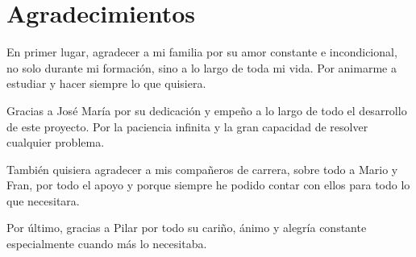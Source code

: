 \documentclass[
11pt, %
oneside, %
spanish, %
singlespacing, %
parskip, %
headsepline, %
]{MastersDoctoralThesis} %
\author{Javier Benito Díaz} %
\begin{document}
\frontmatter %

\pagestyle{plain} %









%
%
%

\chapter*{Agradecimientos}

En primer lugar, agradecer a mi familia por su amor constante e incondicional, no solo durante mi formación, sino a lo largo de toda mi vida. Por animarme a estudiar y hacer siempre lo que quisiera.

Gracias a José María por su dedicación y empeño a lo largo de todo el desarrollo de este proyecto. Por la paciencia infinita y la gran capacidad de resolver cualquier problema.

También quisiera agradecer a mis compañeros de carrera, sobre todo a Mario y Fran, por todo el apoyo y porque siempre he podido contar con ellos para todo lo que necesitara.

Por último, gracias a Pilar por todo su cariño, ánimo y alegría constante especialmente cuando más lo necesitaba.
\end{document}
